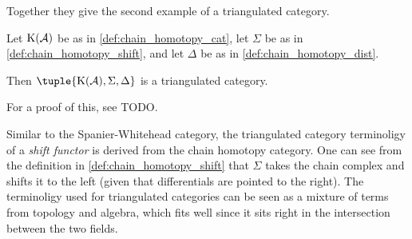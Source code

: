 Together they give the second example of a triangulated category.

\begin{example}
    Let \( \operatorname{K}({\mathcal{A}}) \) be as in \autoref{def:chain_homotopy_cat}, let \( \Sigma \) be as in \autoref{def:chain_homotopy_shift}, and let \( \Delta \) be as in \autoref{def:chain_homotopy_dist}.

    Then \( \tuple{\K(\Ac), \Sigma, \Delta} \) is a triangulated category.
\end{example}

For a proof of this, see TODO.

Similar to the Spanier-Whitehead category, the triangulated category terminoligy of a \emph{shift functor} is derived from the chain homotopy category. One can see from the definition in \autoref{def:chain_homotopy_shift} that \( \Sigma \) takes the chain complex and shifts it to the left (given that differentials are pointed to the right). The terminoligy used for triangulated categories can be seen as a mixture of terms from topology and algebra, which fits well since it sits right in the intersection between the two fields.
